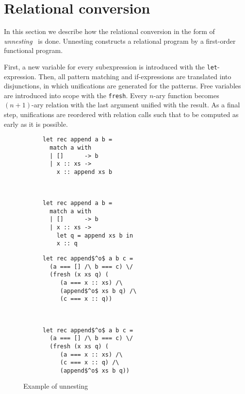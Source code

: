 \section{Relational conversion}
\label{sec:conversion}

In this section we describe how the relational conversion in the form of \emph{unnesting}~\cite{lozov:miniKanren} is done. 
Unnesting constructs a relational program by a first-order functional program. 

First, a new variable for every subexpression is introduced with the \lstinline{let}-expression. 
Then, all pattern matching and if-expressions are translated into disjunctions, in which unifications are generated for the patterns.
Free variables are introduced into scope with the \lstinline{fresh}.
Every $n$-ary function becomes $(n+1)$-ary relation with the last argument unified with the result.
As a final step, unifications are reordered with relation calls such that to be computed as early as it is possible.

\begin{figure}[h!]
  \centering
  \begin{subfigure}[t]{0.4\textwidth}
    \centering
\begin{lstlisting}
let rec append a b =
  match a with
  | []      -> b
  | x :: xs -> 
    x :: append xs b
\end{lstlisting}
\caption{}
\label{unnesting_example_a}
  \end{subfigure}
  ~
  \begin{subfigure}[t]{0.4\textwidth}
        \centering
\begin{lstlisting}
let rec append a b =
  match a with 
  | []      -> b
  | x :: xs -> 
    let q = append xs b in
    x :: q
\end{lstlisting}
\vspace{-1\baselineskip}
\caption{}
\label{unnesting_example_b}
  \end{subfigure}
  \vskip2mm
  \begin{subfigure}[t]{0.4\textwidth}
        \centering
\begin{lstlisting}
let rec append$^o$ a b c =
  (a === [] /\ b === c) \/
  (fresh (x xs q) (
     (a === x :: xs) /\
     (append$^o$ xs b q) /\
     (c === x :: q))
\end{lstlisting}
\caption{}
\label{unnesting_example_c}
  \end{subfigure}
  ~
  \begin{subfigure}[t]{0.4\textwidth}
        \centering
\begin{lstlisting}
let rec append$^o$ a b c =
  (a === [] /\ b === c) \/
  (fresh (x xs q) (
     (a === x :: xs) /\
     (c === x :: q) /\
     (append$^o$ xs b q))
\end{lstlisting}
\caption{}
\label{unnesting_example_d}
  \end{subfigure}  
\caption{Example of unnesting}
\label{unnesting_example}
\end{figure}

